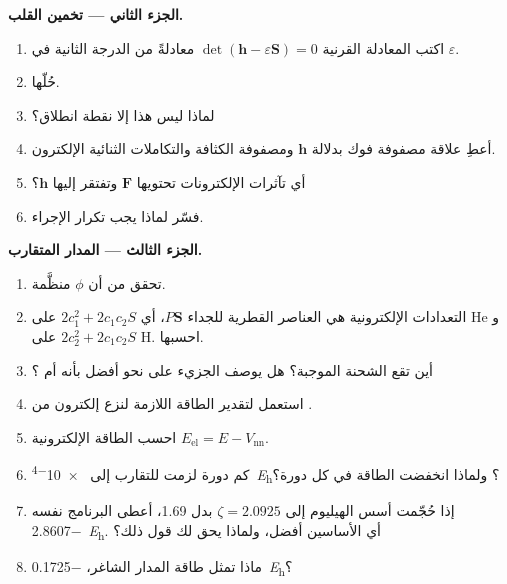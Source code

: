 \begin{problem}
\medskip\noindent\textbf{الجزء الثاني --- تخمين القلب.}
\begin{enumerate}[resume]
  \item اكتب المعادلة القرنية $\det(\mathbf h - \varepsilon\mathbf S) = 0$ معادلةً
        من الدرجة الثانية في $\varepsilon$.
  \item حُلّها.
  \item لماذا ليس هذا إلا نقطة انطلاق؟
  \item أعطِ علاقة مصفوفة فوك بدلالة $\mathbf h$ 
        ومصفوفة الكثافة والتكاملات الثنائية الإلكترون.
  \item أي تآثرات الإلكترونات تحتويها $\mathbf F$ وتفتقر إليها $\mathbf h$؟
  \item فسّر لماذا يجب تكرار الإجراء.
\end{enumerate}

\medskip\noindent\textbf{الجزء الثالث --- المدار المتقارب.}
\begin{enumerate}[resume]
  \item تحقق من أن $\phi$ منظَّمة.
  \item التعدادات الإلكترونية هي العناصر القطرية للجداء $P\mathbf S$، أي $2c_1^2 + 2c_1c_2S$
        على He و$2c_2^2 + 2c_1c_2S$ على H. احسبها.
  \item أين تقع الشحنة الموجبة؟ هل يوصف الجزيء على نحو أفضل
        بأنه  أم ؟
  \item استعمل  لتقدير الطاقة اللازمة لنزع
        إلكترون من .
  \item احسب الطاقة الإلكترونية $E_{\mathrm{el}} = E - V_{\mathrm{nn}}$.
  \item كم دورة لزمت للتقارب إلى \qty{e-4}{\hartree}؟ ولماذا
        انخفضت الطاقة في كل دورة؟
  \item إذا حُجّمت أسس الهيليوم إلى $\zeta = 2.0925$ بدل 1.69، أعطى
        البرنامج نفسه \qty{-2.8607}{\hartree}. أي الأساسين أفضل، 
        ولماذا يحق لك قول ذلك؟
  \item ماذا تمثل طاقة المدار الشاغر، \qty{-0.1725}{\hartree}؟
\end{enumerate}


\end{problem}
